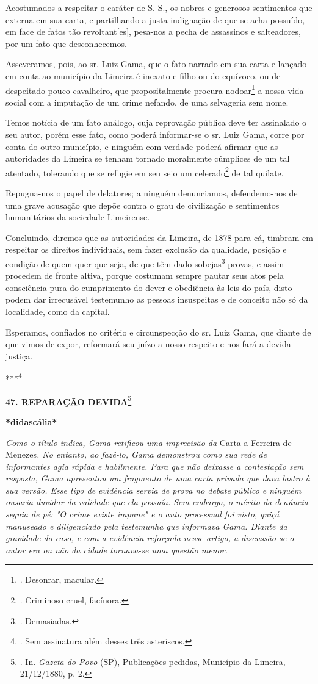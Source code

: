 Acostumados a respeitar o caráter de S. S., os nobres e generosos
sentimentos que externa em sua carta, e partilhando a justa indignação
de que se acha possuído, em face de fatos tão revoltant{[}es{]},
pesa-nos a pecha de assassinos e salteadores, por um fato que
desconhecemos.

Asseveramos, pois, ao sr. Luiz Gama, que o fato narrado em sua carta e
lançado em conta ao município da Limeira é inexato e filho ou do
equívoco, ou de despeitado pouco cavalheiro, que propositalmente procura
nodoar\footnote{. Desonrar, macular.} a nossa vida social com a
imputação de um crime nefando, de uma selvageria sem nome.

Temos notícia de um fato análogo, cuja reprovação pública deve ter
assinalado o seu autor, porém esse fato, como poderá informar-se o sr.
Luiz Gama, corre por conta do outro município, e ninguém com verdade
poderá afirmar que as autoridades da Limeira se tenham tornado
moralmente cúmplices de um tal atentado, tolerando que se refugie em seu
seio um celerado\footnote{. Criminoso cruel, facínora.} de tal quilate.

Repugna-nos o papel de delatores; a ninguém denunciamos, defendemo-nos
de uma grave acusação que depõe contra o grau de civilização e
sentimentos humanitários da sociedade Limeirense.

Concluindo, diremos que as autoridades da Limeira, de 1878 para cá,
timbram em respeitar os direitos individuais, sem fazer exclusão da
qualidade, posição e condição de quem quer que seja, de que têm dado
sobejas\footnote{. Demasiadas.} provas, e assim procedem de fronte
altiva, porque costumam sempre pautar seus atos pela consciência pura do
cumprimento do dever e obediência às leis do país, disto podem dar
irrecusável testemunho as pessoas insuspeitas e de conceito não só da
localidade, como da capital.

Esperamos, confiados no critério e circunspecção do sr. Luiz Gama, que
diante de que vimos de expor, reformará seu juízo a nosso respeito e nos
fará a devida justiça.

***\footnote{. Sem assinatura além desses três asteriscos.}

\textbf{47. REPARAÇÃO DEVIDA}\footnote{. In. \emph{Gazeta do Povo} (SP),
  Publicações pedidas, Município da Limeira, 21/12/1880, p. 2.}

\textbf{*didascália*}

\emph{Como o título indica, Gama retificou uma imprecisão da} Carta a
Ferreira de Menezes\emph{. No entanto, ao fazê-lo, Gama demonstrou como
sua rede de informantes agia rápida e habilmente. Para que não deixasse
a contestação sem resposta, Gama apresentou um fragmento de uma carta
privada que dava lastro à sua versão. Esse tipo de evidência servia de
prova no debate público e ninguém ousaria duvidar da validade que ela
possuía. Sem embargo, o mérito da denúncia seguia de pé: "O crime existe
impune" e o auto processual foi visto, quiçá manuseado e diligenciado
pela testemunha que informava Gama. Diante da gravidade do caso, e com a
evidência reforçada nesse artigo, a discussão se o autor era ou não da
cidade tornava-se uma questão menor. }

